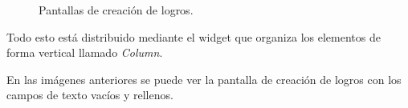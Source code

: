 \begin{figure}[H]%
  \centering
  \qquad
  \caption{Pantallas de creación de logros.}%
  \label{fig:creacion_logros}%
\end{figure}

\newpage

Todo esto está distribuido mediante el widget que organiza los elementos de forma vertical llamado \textit{Column}.

En las imágenes anteriores se puede ver la pantalla de creación de logros con los campos de texto vacíos y rellenos.






